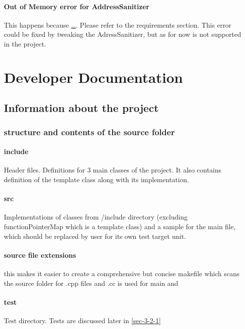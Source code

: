 \documentclass{elteikthesis}[2018/06/06]
\begin{document}
\subsubsection{Out of Memory error for AddressSanitizer}
\label{sec-2-5-2-1}
This happens because \uline{\ldots{}}. Please refer to the requirements section. This error could be fixed by tweaking the AdressSanitizer, but as for now is not supported in the project. \\
\chapter{Developer Documentation}
\label{sec-3}
\section{Information about the project}
\label{sec-3-1}
\subsection{structure and contents of the source folder}
\label{sec-3-1-1}
\subsubsection{include}
\label{sec-3-1-1-1}
Header files. Definitions for 3 main classes of the project. It also contains definition of the template class along with its implementation. \\
\subsubsection{src}
\label{sec-3-1-1-2}
Implementations of classes from /include directory (excluding functionPointerMap which is a template class) and a sample for the main file, which should be replaced by user for its own test target unit. \\
\subsubsection{source file extensions}
\label{sec-3-1-1-3}
this makes it easier to create a comprehensive but concise makefile which scans the source folder for .cpp files and .cc is used for main and \\
\subsubsection{test}
\label{sec-3-1-1-4}
Test directory. Tests are discussed later in \ref{sec-3-2-1} \\
\end{document}
